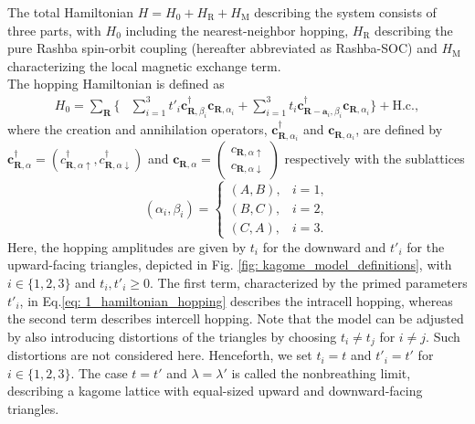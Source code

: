 The total Hamiltonian $H = H_0+ H_\text{R}+ H_\text{M}$ describing the system consists of three parts, with $H_0$ including the nearest-neighbor hopping, $H_\text{R}$ describing the pure Rashba spin-orbit coupling (hereafter abbreviated as Rashba-SOC) and $H_\text{M}$ characterizing the local magnetic exchange term. \\
The hopping Hamiltonian is defined as
\begin{align}
H_0 = \sum_{\mathbf R} \Bigg\{& \sum_{i=1}^{3} t'_i\mathbf{c}_{\mathbf R,\beta_i}^{\dagger} \mathbf{c}_{\mathbf R,\alpha_i} 
+ \sum_{i=1}^{3} t_i\mathbf{c}_{\mathbf R-\mathbf a_i,\beta_i}^{\dagger} \mathbf{c}_{\mathbf R,\alpha_i} \Bigg\} +\mathrm{H.c.},
\label{eq: 1_hamiltonian_hopping}
\end{align}
where the creation and annihilation operators, $\mathbf{c}_{\mathbf{R},\alpha_i}^\dagger$ and $\mathbf{c}_{\mathbf{R},\alpha_i}$, are defined by $\mathbf{c}_{\mathbf R,\alpha}^{\dagger}
  =
  \left(
  c_{\mathbf R,\alpha\uparrow}^{\dagger},
  c_{\mathbf R,\alpha\downarrow}^{\dagger}
  \right)$ and 
  $\mathbf{c}_{\mathbf R,\alpha}
  =
  \begin{pmatrix}
  c_{\mathbf R,\alpha\uparrow}\\
  c_{\mathbf R,\alpha\downarrow}
  \end{pmatrix}$
 respectively with the sublattices 
$$
(\alpha_i,\beta_i) = \begin{cases}
(A,B), & i=1,\\
(B,C), & i=2,\\
(C,A), & i=3.
\end{cases}
$$
Here, the hopping amplitudes are given by $t_i$ for the downward and $t'_i$ for the upward-facing triangles, depicted in Fig. \ref{fig: kagome_model_definitions}, with $i\in\{1,2,3\}$ and $t_i,t'_i\geq0$. The first term, characterized by the primed parameters $t'_i$, in Eq.\eqref{eq: 1_hamiltonian_hopping} describes the intracell hopping, whereas the second term describes intercell hopping. Note that the model can be adjusted by also introducing distortions of the triangles by choosing $t_i \neq t_j$ for $i\neq j$. Such distortions are not considered here. Henceforth, we set $t_i = t$ and $t'_i=t'$ for $i\in\{1,2,3\}$. The case $t=t'$ and $\lambda = \lambda'$ is called the nonbreathing limit, describing a kagome lattice with equal-sized upward and downward-facing triangles.
 
